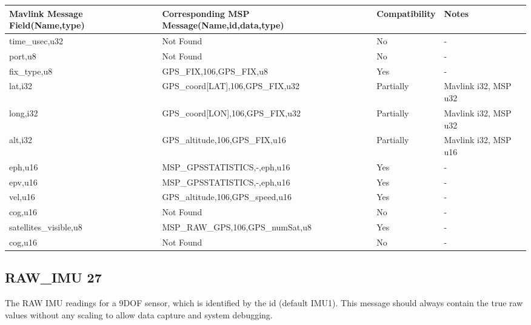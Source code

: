 {
\centering
\begin{tabular}{ |p{4cm  } |p{7cm} | p{2cm}|m{5em}|}
\hline
Mavlink Message Field(Name,type)&Corresponding MSP Message(Name,id,data,type)& Compatibility & Notes\\
\hline
time\_usec,u32 & Not Found & No & - \\
\hline
port,u8 & Not Found & No & - \\
\rowcolor{green}
\hline
fix\_type,u8 & GPS\_FIX,106,GPS\_FIX,u8 & Yes  & - \\
\rowcolor{lightgray}
\hline
lat,i32 &  	GPS\_coord[LAT],106,GPS\_FIX,u32 & Partially   & Mavlink i32, MSP u32\\
\rowcolor{lightgray}
\hline
long,i32 &  	GPS\_coord[LON],106,GPS\_FIX,u32 & Partially   & Mavlink i32, MSP u32\\
\rowcolor{lightgray}
\hline
alt,i32 &  	GPS\_altitude,106,GPS\_FIX,u16 & Partially   & Mavlink i32, MSP u16\\
\hline
\rowcolor{green}
eph,u16 & MSP\_GPSSTATISTICS,-,eph,u16 & Yes & - \\
\hline
\rowcolor{green}
epv,u16 & MSP\_GPSSTATISTICS,-,eph,u16 & Yes & - \\
\rowcolor{green}
\hline
vel,u16 & GPS\_altitude,106,GPS\_speed,u16 & Yes   & - \\
\hline
cog,u16 & Not Found & No & - \\
\hline
\rowcolor{green}
satellites\_visible,u8 & MSP\_RAW\_GPS,106,GPS\_numSat,u8& Yes & - \\
\hline
cog,u16 & Not Found & No & - \\
\end{tabular}
}

\cleardoublepage





\subsection{RAW\_IMU 27} 
The RAW IMU readings for a 9DOF sensor, which is identified by the id (default IMU1). This message should always contain the true raw values without any scaling to allow data capture and system debugging. \\

